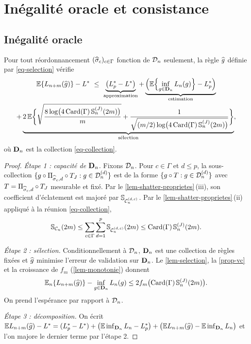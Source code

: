 \section{Inégalité oracle et consistance}\label{sec-reproduction}

\subsection{Inégalité oracle}

\begin{theoreme}\label{thm-oracle}
Pour tout réordonnancement $(\widehat{\sigma}_c)_{c\in\Gamma}$ fonction de $\mathcal{D}_n$ seulement, la règle $\widehat{g}$ définie par \eqref{eq-selection} vérifie
\begin{multline*}
  \E\{L_{n+m}(\hg)\}-L^*\ \le\ \underbrace{\bigl(L^*_p-L^*\bigr)}_{\text{approximation}}
  +\underbrace{\Bigl(\E\Bigl\{\inf_{g\in\bD_n}L_n(g)\Bigr\}-L^*_p\Bigr)}_{\text{estimation}}\\
  +\underbrace{2\,\E\biggl\{\sqrt{\frac{8\log\bigl(4\Card(\Gamma)\,\Sh^{(J)}_n(2m)\bigr)}{m}}+\frac{1}{\sqrt{(m/2)\log\bigl(4\Card(\Gamma)\,\Sh^{(J)}_n(2m)\bigr)}}\biggr\}}_{\text{sélection}},
\end{multline*}
où $\mathbf{D}_n$ est la collection \eqref{eq-collection}.
\end{theoreme}

\begin{proof}
\emph{Étape 1 : capacité de $\mathbf{D}_n$.} Fixons $\mathcal{D}_n$. Pour $c\in\Gamma$ et $d\le p$, la sous-collection $\{g\circ\Pi_{\widehat{\sigma}_c,d}\circ T_J:g\in\mathcal{D}_n^{(d)}\}$ est de la forme $\{g\circ T:g\in\mathcal{D}_n^{(d)}\}$ avec $T=\Pi_{\widehat{\sigma}_c,d}\circ T_J$ mesurable et fixé. Par le \cref{lem-shatter-proprietes}\,(iii), son coefficient d'éclatement est majoré par $\mathbb{S}_{\mathcal{C}_n^{(d,c)}}$. Par le \cref{lem-shatter-proprietes}\,(ii) appliqué à la réunion \eqref{eq-collection},
\[
  \mathbb{S}_{\mathcal{C}_n}(2m)\le\sum_{c\in\Gamma}\sum_{d=1}^p\mathbb{S}_{\mathcal{C}_n^{(d,c)}}(2m)\le\operatorname{Card}(\Gamma)\,\mathbb{S}^{(J)}_n(2m).
\]

\emph{Étape 2 : sélection.} Conditionnellement à $\mathcal{D}_n$, $\mathbf{D}_n$ est une collection de règles fixées et $\widehat{g}$ minimise l'erreur de validation sur $\mathbf{D}_n$. Le \cref{lem-selection}, la \cref{prop-vc} et la croissance de $f_m$ (\cref{lem-monotonie}) donnent
\[
  \mathbb{E}_n\{L_{n+m}(\widehat{g})\}-\inf_{g\in\mathbf{D}_n}L_n(g)\le2f_m\bigl(\operatorname{Card}(\Gamma)\,\mathbb{S}^{(J)}_n(2m)\bigr).
\]
On prend l'espérance par rapport à $\mathcal{D}_n$.

\emph{Étape 3 : décomposition.} On écrit
$\mathbb{E} L_{n+m}(\widehat{g})-L^*=(L^*_p-L^*)+\bigl(\mathbb{E}\inf_{\mathbf{D}_n}L_n-L^*_p\bigr)+\bigl(\mathbb{E} L_{n+m}(\widehat{g})-\mathbb{E}\inf_{\mathbf{D}_n}L_n\bigr)$ et l'on majore le dernier terme par l'étape 2.
\end{proof}

